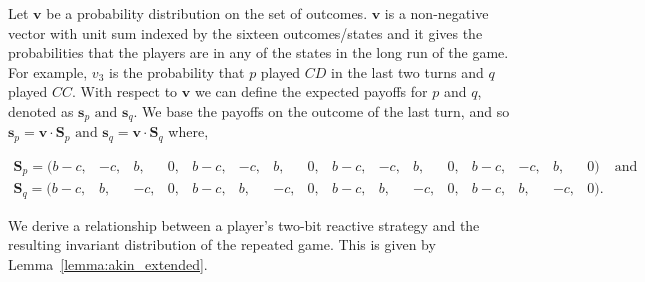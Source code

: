 \documentclass{article}
\theoremstyle{definition}
\begin{document}

Let \(\mathbf{v}\) be a probability distribution on the set of outcomes.
\(\mathbf{v}\) is a non-negative vector with unit sum indexed by the sixteen
outcomes/states and it gives the probabilities that the players are in any
of the states in the long run of the game. For example, \(v_3\) is the
probability that \(p\) played \(CD\) in the last two turns and \(q\) played
\(CC\). With respect to \(\mathbf{v}\) we can define the expected payoffs for
\(p\) and \(q\), denoted as \(\mathbf{s}_{p} \text{ and } \mathbf{s}_{q}\). We
base the payoffs on the outcome of the last turn, and so \(\mathbf{s}_{p} =
\mathbf{v} \cdot \mathbf{S}_{p} \text{ and } \mathbf{s}_{q} = \mathbf{v} \cdot
\mathbf{S}_{q} \) where,

\vspace{-.5cm}

\begin{equation}\label{eq:last_round_two_bits}
\begin{array}{*{17}{c}}
  \mathbf{S}_{p} = ( b\!-\!c , & -c , & b , & 0 , & b\!-\!c , & -c , & b , & 0 , & b\!-\!c , & -c , & b , & 0 , & b\!-\!c , & -c , & b , & 0) & \text{and} \\
  \mathbf{S}_{q} = ( b\!-\!c, & b, & -c, & 0, & b\!-\!c, & b, & -c, & 0, & b\!-\!c, & b, & -c, & 0, & b\!-\!c, & b, & -c, & 0). &
\end{array}
\end{equation}

We derive a relationship between a player's  two-bit reactive strategy and the
resulting invariant distribution of the repeated game. This is given by
Lemma~\ref{lemma:akin_extended}.
\end{document}
